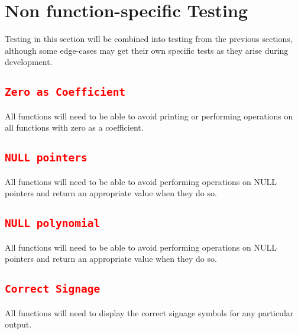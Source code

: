 \documentclass[11pt]{report}
\begin{document}
\section*{Non function-specific Testing}
Testing in this section will be combined into testing from the previous sections, although some edge-cases may get their own specific tests as they arise during development.
\subsection*{\texttt{\textcolor{red}{Zero as Coefficient}}}
All functions will need to be able to avoid printing or performing operations on all functions with zero as a coefficient.
\subsection*{\texttt{\textcolor{red}{NULL pointers}}}
All functions will need to be able to avoid performing operations on NULL pointers and return an appropriate value when they do so.
\subsection*{\texttt{\textcolor{red}{NULL polynomial}}}
All functions will need to be able to avoid performing operations on NULL pointers and return an appropriate value when they do so.
\subsection*{\texttt{\textcolor{red}{Correct Signage}}}
All functions will need to display the correct signage symbols for any particular output.
\end{document}
